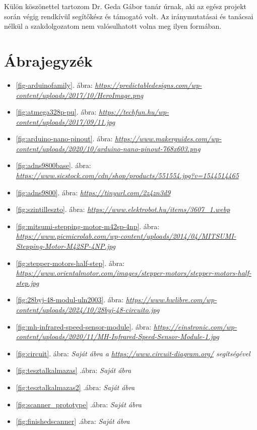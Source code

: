 \documentclass[]{thesis-ekf}
\theoremstyle{definition}
\theoremstyle{remark}
\begin{document}
	Külön köszönettel tartozom Dr. Geda Gábor tanár úrnak, aki az egész projekt során végig rendkívül segítőkész és támogató volt. Az iránymutatásai és tanácsai nélkül a szakdolgozatom nem valósulhatott volna meg ilyen formában.
	\chapter*{Ábrajegyzék}
	\begin{itemize}
		\item \ref{fig-arduinofamily}. ábra: \emph{\url{https://predictabledesigns.com/wp-content/uploads/2017/10/HeroImage.png}}
		\item \ref{fig:atmega328p-pu}. ábra: \emph{\url{https://techfun.hu/wp-content/uploads/2017/09/11.jpg}}
		\item \ref{fig:arduino-nano-pinout}. ábra: \emph{\url{https://www.makerguides.com/wp-content/uploads/2020/10/arduino-nano-pinout-768x603.png}}
		\item \ref{fig:adns9800base}. ábra: \emph{\url{https://www.sicstock.com/cdn/shop/products/551554.jpg?v=1544514465}}
		\item \ref{fig:adns9800}. ábra: \emph{\url{https://tinyurl.com/2z4zn3d9}} 
		\item \ref{fig:szintilleszto}. ábra: \emph{\url{https://www.elektrobot.hu/items/3607_1.webp}}
		\item \ref{fig:mitsumi-stepping-motor-m42sp-4np}. ábra: \emph{\url{https://www.picmicrolab.com/wp-content/uploads/2014/04/MITSUMI-Stepping-Motor-M42SP-4NP.jpg}}
		\item \ref{fig:stepper-motors-half-step}. ábra: \emph{\url{https://www.orientalmotor.com/images/stepper-motors/stepper-motors-half-step.jpg}}
		\item \ref{fig:28byj-48-modul-uln2003}. ábra: \emph{\url{https://www.hwlibre.com/wp-content/uploads/2024/10/28byj-48-circuito.jpg}}
		\item \ref{fig:mh-infrared-speed-sensor-module}. ábra: \emph{\url{https://einstronic.com/wp-content/uploads/2020/11/MH-Infrared-Speed-Sensor-Module-1.jpg}}
		\item \ref{fig:circuit}. ábra: \emph{Saját ábra a \url{https://www.circuit-diagram.org/} segítségével}
		\item \ref{fig:tesztalkalmazas} .ábra: \emph{Saját ábra}
		\item \ref{fig:tesztalkalmazas2} .ábra: \emph{Saját ábra}
		\item \ref{fig:scanner_prototype} .ábra: \emph{Saját ábra}
		\item \ref{fig:finishedscanner} .ábra: \emph{Saját ábra}
	\end{itemize}
\end{document}
